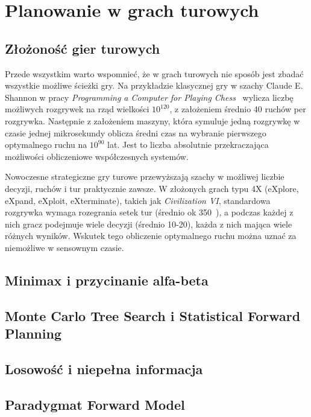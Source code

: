 \documentclass[
    bindingoffset=5mm,
    footnoteindent=3mm,
    hyphenation=true
]{src/wut-thesis}
\begin{document}
\clearpage
\section{Planowanie w grach turowych}

\subsection{Złożoność gier turowych}

Przede wszystkim warto wspomnieć, że w grach turowych nie sposób jest zbadać
wszystkie możliwe ścieżki gry. Na przykładzie klasycznej gry w szachy Claude E.
Shannon w pracy \emph{Programming a Computer for Playing Chess}~\cite{SHANNON} wylicza liczbę
możliwych rozgrywek na rząd wielkości $10^{120}$, z założeniem średnio 40 ruchów per
rozgrywka. Następnie z założeniem maszyny, która symuluje jedną rozgrywkę w czasie
jednej mikrosekundy oblicza średni czas na wybranie pierwszego optymalnego ruchu
na $10^{90}$ lat. Jest to liczba absolutnie przekraczająca możliwości obliczeniowe
współczesnych systemów.

Nowoczesne strategiczne gry turowe przewyższają szachy w możliwej liczbie decyzji,
ruchów i tur praktycznie zawsze. W złożonych grach typu 4X (eXplore, eXpand,
eXploit, eXterminate), takich jak \emph{Civilization VI}, standardowa rozgrywka wymaga
rozegrania setek tur (średnio ok 350~\cite{CIV}), a podczas każdej z nich gracz podejmuje
wiele decyzji (średnio 10-20), każda z nich mająca wiele różnych wyników. Wskutek
tego obliczenie optymalnego ruchu można uznać za niemożliwe w sensownym czasie.

\subsection{Minimax i przycinanie alfa-beta}

\subsection{Monte Carlo Tree Search i Statistical Forward Planning}

\subsection{Losowość i niepełna informacja}

\subsection{Paradygmat Forward Model}
\end{document}
